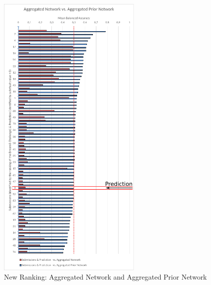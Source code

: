 \begin{figure}[H]
\centering
\includegraphics[width=0.62\textwidth]{./Bilder/Scoring/dreamchallenge/Meanbacc_vertical_comparison.pdf}
\caption[New Ranking (Balanced Accuracy): Aggr. Network and Aggr.Prior Network]{New Ranking: Aggregated Network and Aggregated Prior Network}
\label{fig:}
\end{figure}







